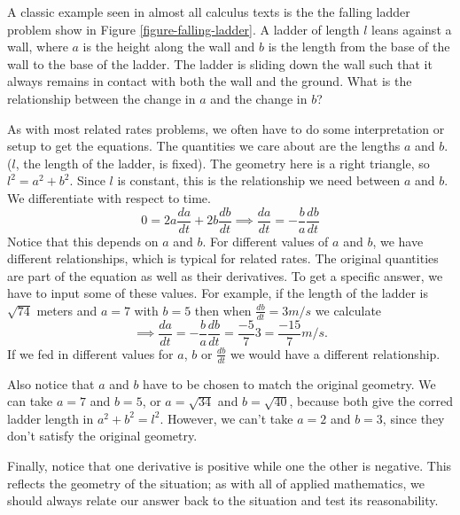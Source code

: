 \documentclass[fleqn]{report}
\begin{document}
\begin{example}
A classic example seen in almost all calculus texts is the the
falling ladder problem show in Figure \ref{figure-falling-ladder}. A
ladder of length $l$ leans against a wall, where $a$ is the height
along the wall and $b$ is the length from the base of the wall to the
base of the ladder. The ladder is sliding down the wall such that it
always remains in contact with both the wall and the ground. What is
the relationship between the change in $a$ and the change in $b$?

As with most related rates problems, we often have to do some
interpretation or setup to get the equations. The quantities
we care about are the lengths $a$ and $b$. ($l$, the length
of the ladder, is fixed). The geometry here is a right
triangle, so $l^2 = a^2 + b^2$. Since $l$ is constant, this
is the relationship we need between $a$ and $b$. We
differentiate with respect to time.
\begin{equation*}
0 = 2a \frac{da}{dt} + 2b \frac{db}{dt} \implies \frac{da}{dt} =
-\frac{b}{a} \frac{db}{dt} 
\end{equation*}
Notice that this depends on $a$ and $b$. For different values
of $a$ and $b$, we have different relationships, which is
typical for related rates. The original quantities are part of
the equation as well as their derivatives. To get a specific
answer, we have to input some of these values. For example, if
the length of the ladder is $\sqrt{74}$ meters and $a=7$ with
$b=5$ then when $\frac{db}{dt} = 3 m/s$ we calculate
\begin{equation*}
\implies \frac{da}{dt} =
-\frac{b}{a} \frac{db}{dt} = \frac{-5}{7} 3 = \frac{-15}{7}
m/s.
\end{equation*}
If we fed in different values for $a$, $b$ or $\frac{db}{dt}$
we would have a different relationship. 

Also notice that $a$ and $b$ have to be chosen to match the
original geometry. We can take $a=7$ and $b=5$, or $a =
\sqrt{34}$ and $b = \sqrt{40}$, because both give the corred
ladder length in $a^2 + b^2 = l^2$. However, we can't take $a
= 2$ and $b=3$, since they don't satisfy the original
geometry. 

Finally, notice that one derivative is positive while one the
other is negative. This reflects the geometry of the
situation; as with all of applied mathematics, we should
always relate our answer back to the situation and test its
reasonability.
\end{example}
\end{document}
